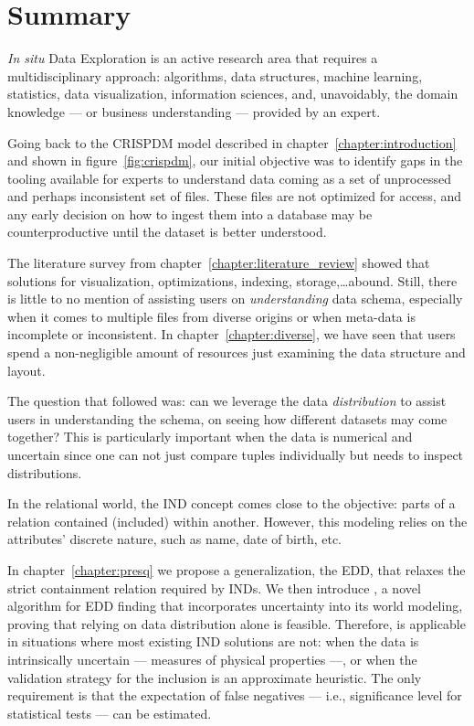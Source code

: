 \glsresetall

\section{Summary}

\emph{In situ} Data Exploration is an active research area that requires
a multidisciplinary approach: algorithms, data structures, machine learning,
statistics,  data visualization, information sciences, and, unavoidably,
the domain knowledge --- or business understanding ---  provided by an expert.

Going back to the \gls{CRISPDM} model described in  chapter~\ref{chapter:introduction}
and shown in figure~\ref{fig:crispdm}, our initial objective was to identify
gaps in the tooling available for experts to understand data coming as a set of
unprocessed and perhaps inconsistent set of files. These files are not optimized
for access, and any early decision on how to ingest them into a database may be
counterproductive until the dataset is better understood.

The literature survey from chapter~\ref{chapter:literature_review} showed that
solutions for visualization, optimizations, indexing, storage,\ldots abound.
Still, there is little to no mention of assisting users on \emph{understanding}
data schema, especially when it comes to multiple files from diverse origins or
when meta-data is incomplete or inconsistent.
In chapter~\ref{chapter:diverse}, we have seen that users spend a non-negligible
amount of resources just examining the data structure and layout.

The question that followed was: can we leverage the data \emph{distribution} to
assist users in understanding the schema, on seeing how different datasets may come together?
This is particularly important when the data is numerical and uncertain since
one can not just compare tuples individually but needs to inspect distributions.

In the relational world, the \gls{IND} concept comes close to the objective:
parts of a relation contained (included) within another. However, this modeling
relies on the attributes' discrete nature, such as name, date of birth, etc.

In chapter~\ref{chapter:presq} we propose a generalization, the \gls{EDD}, that
relaxes the strict containment relation required by \glspl{IND}.
We then introduce \PresQ, a novel algorithm for \gls{EDD} finding that incorporates
uncertainty into its world modeling, proving that relying on data distribution alone is feasible.
Therefore, \PresQ is applicable in situations where most existing \gls{IND} solutions
are not: when the data is intrinsically uncertain --- measures of physical properties ---,
or when the validation strategy for the inclusion is an approximate heuristic.
The only requirement is that the expectation of false negatives --- i.e., significance
level for statistical tests --- can be estimated.

